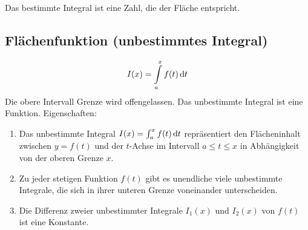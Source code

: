 Das bestimmte Integral ist eine Zahl, die der Fläche entspricht.

\subsection{Flächenfunktion (unbestimmtes Integral)}
\begin{equation*}
	I(x) = \int\limits_a^x f(t)\,\mathrm dt
\end{equation*}
Die obere Intervall Grenze wird offengelassen. Das unbestimmte Integral ist eine Funktion. Eigenschaften:
\begin{enumerate}\itemsep0em
	\item Das unbestimmte Integral $I(x) = \int_a^x f(t)\,\mathrm dt$ repräsentiert den Flächeninhalt zwischen $y = f(t)$ und der $t$-Achse im Intervall $a \leq t \leq x$ in Abhängigkeit
	von der oberen Grenze $x$.
	\item Zu jeder stetigen Funktion $f(t)$ gibt es unendliche viele unbestimmte Integrale, die sich in ihrer unteren Grenze voneinander unterscheiden.
	\item Die Differenz zweier unbestimmter Integrale $I_1(x)$ und $I_2(x)$ von $f(t)$ ist eine Konstante.
\end{enumerate}
